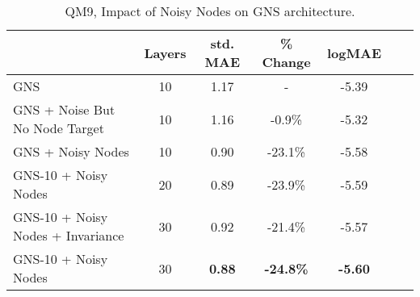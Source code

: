\documentclass{article} \usepackage{iclr2022_conference,times}
\begin{document}
\begin{table}
\caption{QM9, Impact of Noisy Nodes on GNS architecture.}
\centering
\begin{tabular}{lcccccc}
\toprule
    & Layers & std. MAE & \% Change & logMAE & \\
\midrule
GNS & 10  & 1.17 & - & -5.39 \\
GNS + Noise But No Node Target & 10 & 1.16 & -0.9\% & -5.32\\
GNS + Noisy Nodes & 10 & 0.90 & -23.1\% & -5.58\\
GNS-10 + Noisy Nodes & 20 & 0.89 & -23.9\% & -5.59\\
GNS-10 + Noisy Nodes + Invariance & 30 & 0.92 & -21.4\% & -5.57 \\
GNS-10 + Noisy Nodes & 30 & \textbf{0.88} & \textbf{-24.8\%} & \textbf{-5.60}\\
\bottomrule
\end{tabular}
\label{tab:qm9_comparison}
\end{table}
\end{document}

